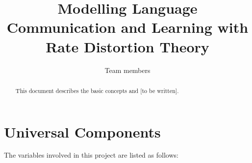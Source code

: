 \documentclass[11pt]{article}
\title{Modelling Language Communication and Learning with \\ Rate Distortion Theory}
\author{Team members}
\date{}
\begin{document}
\maketitle
\linenumbers
\begin{abstract}
  This document describes the basic concepts and [to be written].
\end{abstract}

\section{Universal Components}
\label{sec:uni_components}


The variables involved in this project are listed as follows:
\end{document}
